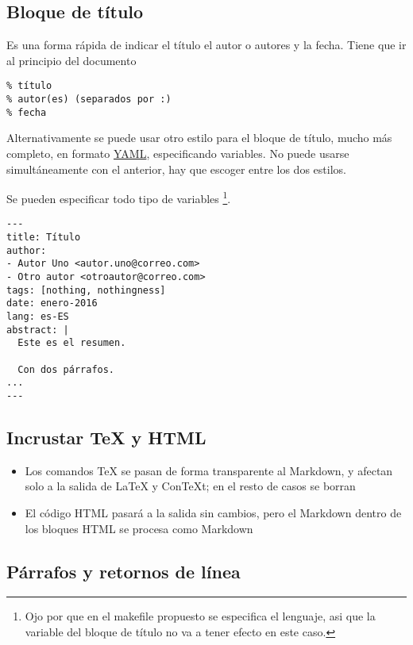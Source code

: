 \documentclass[
  12pt,
  spanish,
]{article}
\providecommand{\tightlist}{%
  \setlength{\itemsep}{0pt}\setlength{\parskip}{0pt}}
\begin{document}
\hypertarget{bloque-de-tuxedtulo}{%
\subsection{Bloque de título}\label{bloque-de-tuxedtulo}}

Es una forma rápida de indicar el título el autor o autores y la fecha.
Tiene que ir al principio del documento

\begin{verbatim}
% título
% autor(es) (separados por :)
% fecha
\end{verbatim}

Alternativamente se puede usar otro estilo para el bloque de título,
mucho más completo, en formato
\href{https://en.wikipedia.org/wiki/YAML}{YAML}, especificando
variables. No puede usarse simultáneamente con el anterior, hay que
escoger entre los dos estilos.

Se pueden especificar todo tipo de variables \footnote{Ojo por que en el
  makefile propuesto se especifica el lenguaje, asi que la variable del
  bloque de título no va a tener efecto en este caso.}.

\begin{verbatim}
---
title: Título
author:
- Autor Uno <autor.uno@correo.com>
- Otro autor <otroautor@correo.com>
tags: [nothing, nothingness]
date: enero-2016
lang: es-ES
abstract: |
  Este es el resumen.

  Con dos párrafos.
...
---
\end{verbatim}

\hypertarget{incrustar-tex-y-html}{%
\subsection{Incrustar TeX y HTML}\label{incrustar-tex-y-html}}

\begin{itemize}
\tightlist
\item
  Los comandos TeX se pasan de forma transparente al Markdown, y afectan
  solo a la salida de LaTeX y ConTeXt; en el resto de casos se borran
\item
  El código HTML pasará a la salida sin cambios, pero el Markdown dentro
  de los bloques HTML se procesa como Markdown
\end{itemize}

\hypertarget{puxe1rrafos-y-retornos-de-luxednea}{%
\subsection{Párrafos y retornos de
línea}\label{puxe1rrafos-y-retornos-de-luxednea}}
\end{document}
